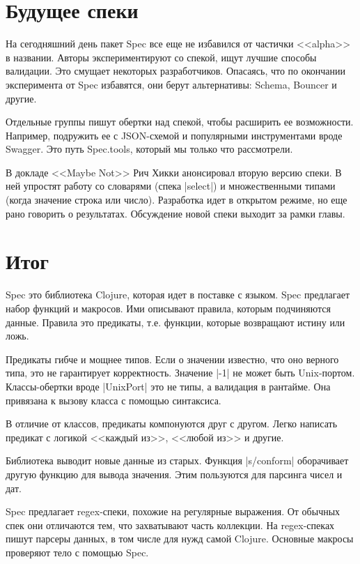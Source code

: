\section{Будущее спеки}

На сегодняшний день пакет Spec все еще не избавился от частички <<alpha>> в
названии. Авторы экспериментируют со спекой, ищут лучшие способы валидации. Это
смущает некоторых разработчиков. Опасаясь, что по окончании эксперимента от Spec
избавятся, они берут альтернативы:
Schema,
Bouncer и другие.

Отдельные группы пишут обертки над спекой, чтобы расширить ее
возможности. Например, подружить ее с JSON-схемой и популярными инструментами
вроде Swagger. Это путь Spec.tools, который мы только что рассмотрели.

В докладе <<Maybe Not>> Рич
Хикки анонсировал вторую версию спеки. В ней упростят работу со словарями (спека
\spverb|select|) и множественными типами (когда значение строка или
число). Разработка идет в открытом режиме, но еще рано говорить о
результатах. Обсуждение новой спеки выходит за рамки главы.

\section{Итог}

Spec это библиотека Clojure, которая идет в поставке с языком. Spec предлагает
набор функций и макросов. Ими описывают правила, которым подчиняются
данные. Правила это предикаты, т.е. функции, которые возвращают истину или ложь.

Предикаты гибче и мощнее типов. Если о значении известно, что оно верного типа,
это не гарантирует корректность. Значение \spverb|-1| не может быть
Unix-портом. Классы-обертки вроде \spverb|UnixPort| это не типы, а валидация в
рантайме. Она привязана к вызову класса с помощью синтаксиса.

В отличие от классов, предикаты компонуются друг с другом. Легко написать
предикат с логикой <<каждый из>>, <<любой из>> и другие.

Библиотека выводит новые данные из старых. Функция \spverb|s/conform|
оборачивает другую функцию для вывода значения. Этим пользуются для парсинга
чисел и дат.

Spec предлагает regex-спеки, похожие на регулярные выражения. От обычных спек
они отличаются тем, что захватывают часть коллекции. На regex-спеках пишут
парсеры данных, в том числе для нужд самой Clojure. Основные макросы проверяют
тело с помощью Spec.

